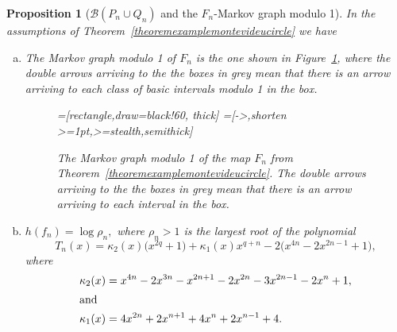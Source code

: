 \documentclass[a4paper, 11pt]{amsart}
\numberwithin{equation}{section}
\newtheorem{proposition}[theorem]{Proposition}
\theoremstyle{customnumberedtheorem}
\theoremstyle{definitionwithbfnote}
\newcommand{\bigBIclass}[1]{\ensuremath{\bigl\llbracket #1\bigr\rrbracket}}
\def\calB{\mathcal{B}}
\begin{document}
\begin{proposition}[$\calB(P_n \cup Q_n)$ and the $F_n$-Markov graph modulo 1]\label{propositionmarkovgraphexamplemontevideu}
In the assumptions of Theorem~\ref{theoremexamplemontevideucircle} we have
\begin{enumerate}[(a)]
\item The Markov graph modulo 1 of $F_n$ is the one shown in
Figure~\ref{graphlemmafngraphmontevideu},
where the double arrows arriving to the the boxes in grey mean that
there is an arrow arriving to each class of basic intervals modulo 1
in the box.
\begin{figure}[t]
\begin{center}\small
  =[rectangle,draw=black!60, thick]%
  =[->,shorten >=1pt,>=stealth,semithick]%
\end{center}
\caption{The Markov graph modulo 1 of the map $F_n$ from
Theorem~\ref{theoremexamplemontevideucircle}.
The double arrows arriving to the the boxes in grey mean that
there is an arrow arriving to each interval in the box.}\label{graphlemmafngraphmontevideu}
\end{figure}

\item $h(f_n) = \log \rho_n,$ where $\rho_n > 1$ is the largest root
of the polynomial
\[
    T_n(x)  = \kappa_2(x)\bigl(x^{2q} + 1\bigr) + \kappa_1(x)x^{q+n}
              - 2\bigl(x^{4n} - 2x^{2n-1} + 1\bigr) ,
\]
where
\begin{align*}
   \kappa_2(x) &=  x^{4n} - 2x^{3n} - x^{2n+1} - 2x^{2n} - 3x^{2n-1} - 2x^{n} + 1,\\
\intertext{and}
   \kappa_1(x) &= 4x^{2n} + 2x^{n+1} + 4x^{n} + 2x^{n-1} + 4.
\end{align*}
\end{enumerate}
\end{proposition}
\end{document}

